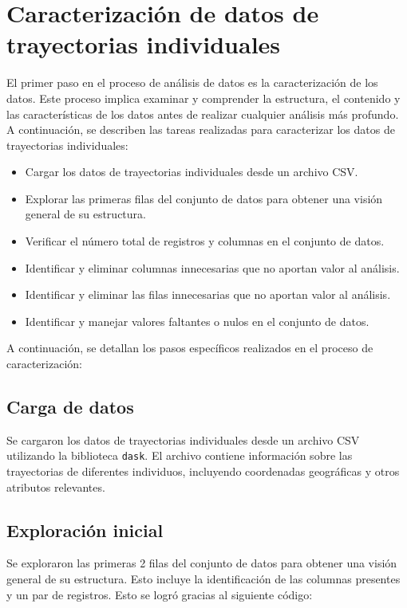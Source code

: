 \section{Caracterización de datos de trayectorias individuales}

\noindent El primer paso en el proceso de análisis de datos es la caracterización de los datos. Este proceso implica examinar y comprender la estructura, el contenido y las características de los datos antes de realizar cualquier análisis más profundo. A continuación, se describen las tareas realizadas para caracterizar los datos de trayectorias individuales:
\begin{itemize}
    \item Cargar los datos de trayectorias individuales desde un archivo CSV.
    \item Explorar las primeras filas del conjunto de datos para obtener una visión general de su estructura.
    \item Verificar el número total de registros y columnas en el conjunto de datos.
    \item Identificar y eliminar columnas innecesarias que no aportan valor al análisis.
    \item Identificar y eliminar las filas innecesarias que no aportan valor al análisis.
    \item Identificar y manejar valores faltantes o nulos en el conjunto de datos.

\end{itemize}
\noindent A continuación, se detallan los pasos específicos realizados en el proceso de caracterización:

\subsection{Carga de datos}
\noindent Se cargaron los datos de trayectorias individuales desde un archivo CSV utilizando la biblioteca \texttt{dask}. El archivo contiene información sobre las trayectorias de diferentes individuos, incluyendo coordenadas geográficas y otros atributos relevantes. 

\subsection{Exploración inicial}
\noindent Se exploraron las primeras 2 filas del conjunto de datos para obtener una visión general de su estructura. Esto incluye la identificación de las columnas presentes y un par de registros. Esto se logró gracias al siguiente código:

